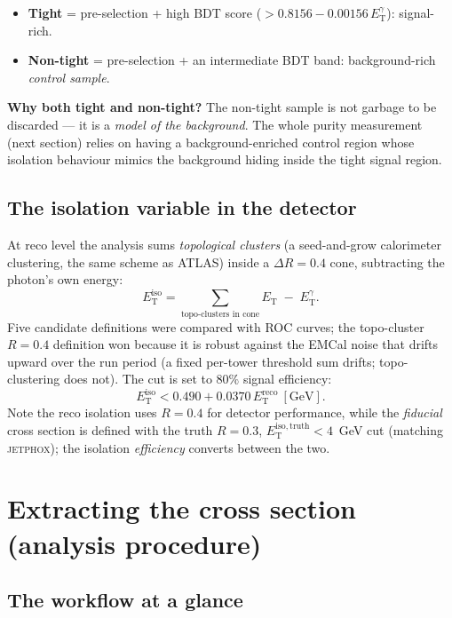 \documentclass[11pt]{article}
\newlength{\calloutwd}
\newenvironment{bgbox}{%
  \par\vspace{6pt}\noindent
  \setlength{\fboxsep}{8pt}%
  \begingroup\color{black}%
  \def\calloutbg{boxblue}\def\calloutline{bgblueline}%
  \fcolorbox{bgblueline}{boxblue}\bgroup
  \begin{minipage}{\calloutwd}}
  {\end{minipage}\egroup\endgroup\par\vspace{6pt}}
\newcommand{\ET}{E_{\mathrm{T}}}
\newcommand{\ETg}{E_{\mathrm{T}}^{\gamma}}
\newcommand{\Eiso}{E_{\mathrm{T}}^{\mathrm{iso}}}
\newcommand{\Eisotruth}{E_{\mathrm{T}}^{\mathrm{iso,truth}}}
\newcommand{\dR}{\Delta R}
\begin{document}
\begin{itemize}[leftmargin=1.4em]
  \item \textbf{Tight} = pre-selection + high BDT score ($> 0.8156 - 0.00156\,\ETg$): signal-rich.
  \item \textbf{Non-tight} = pre-selection + an intermediate BDT band: background-rich
  \emph{control sample}.
\end{itemize}

\begin{bgbox}
\textbf{Why both tight and non-tight?} The non-tight sample is not garbage to be discarded --- it
is a \emph{model of the background}. The whole purity measurement (next section) relies on having a
background-enriched control region whose isolation behaviour mimics the background hiding inside the
tight signal region.
\end{bgbox}

\subsection{The isolation variable in the detector}

At reco level the analysis sums \emph{topological clusters} (a seed-and-grow calorimeter clustering,
the same scheme as ATLAS) inside a $\dR=0.4$ cone, subtracting the photon's own energy:
\[
  \Eiso = \sum_{\text{topo-clusters in cone}} \ET \;-\; E_{\mathrm{T}}^{\gamma}.
\]
Five candidate definitions were compared with ROC curves; the topo-cluster $R=0.4$ definition won
because it is robust against the EMCal noise that drifts upward over the run period (a fixed
per-tower threshold sum drifts; topo-clustering does not). The cut is set to $80\%$ signal
efficiency:
\[
  \Eiso < 0.490 + 0.0370\,E_{\mathrm{T}}^{\mathrm{reco}}\ [\text{GeV}].
\]
Note the reco isolation uses $R=0.4$ for detector performance, while the \emph{fiducial} cross
section is defined with the truth $R=0.3$, $\Eisotruth<4$~GeV cut (matching \textsc{jetphox}); the
isolation \emph{efficiency} converts between the two.

\section{Extracting the cross section (analysis procedure)}

\subsection{The workflow at a glance}
\end{document}
